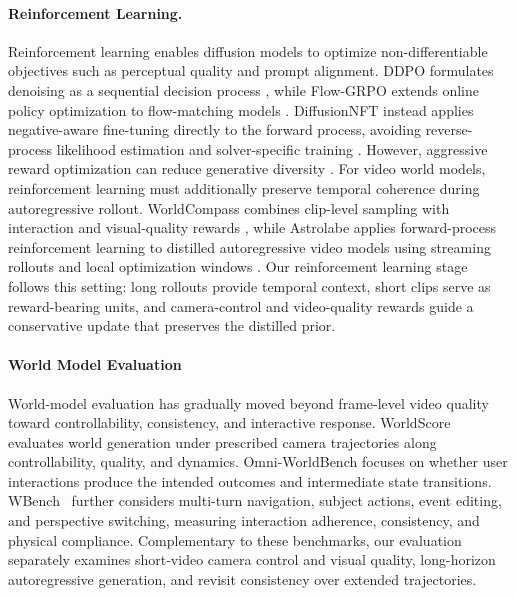 \paragraph{\bf{Reinforcement Learning.}}
Reinforcement learning enables diffusion models to optimize non-differentiable
objectives such as perceptual quality and prompt alignment. DDPO formulates
denoising as a sequential decision process \citep{black2023ddpo}, while
Flow-GRPO extends online policy optimization to flow-matching models
\citep{liu2025flowgrpo}. DiffusionNFT instead applies negative-aware
fine-tuning directly to the forward process, avoiding reverse-process likelihood
estimation and solver-specific training \citep{zheng2025diffusionnft}.
However, aggressive reward optimization can reduce generative diversity
\citep{chen2025taming}.
For video world models, reinforcement learning must additionally preserve
temporal coherence during autoregressive rollout. WorldCompass combines
clip-level sampling with interaction and visual-quality rewards
\citep{wang2026worldcompass}, while Astrolabe applies forward-process
reinforcement learning to distilled autoregressive video models using streaming
rollouts and local optimization windows \citep{zhang2026astrolabe}.
Our reinforcement learning stage follows this setting: long rollouts provide temporal
context, short clips serve as reward-bearing units, and camera-control and
video-quality rewards guide a conservative update that preserves the distilled
prior.

\paragraph{\bf{World Model Evaluation}} 
World-model evaluation has gradually moved beyond frame-level video quality~\citep{chen2025finger, ling2025vmbench}
toward controllability, consistency, and interactive response. WorldScore~\citep{duan2025worldscore}
evaluates world generation under prescribed camera trajectories along
controllability, quality, and dynamics. Omni-WorldBench\citep{wu2026omniworldbench} focuses on whether user
interactions produce the intended outcomes and intermediate state transitions. WBench~\citep{ying2026wbenchcomprehensivemultiturnbenchmark} further considers multi-turn navigation, subject actions, event editing, and perspective switching, measuring interaction adherence, consistency, and physical compliance. Complementary to these benchmarks, our evaluation separately examines short-video camera control and visual quality, long-horizon autoregressive generation, and revisit consistency over extended trajectories.